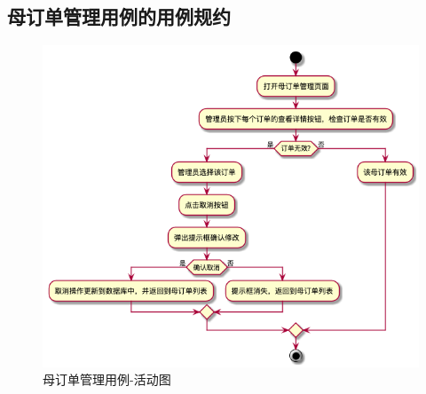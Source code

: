 \subsection{母订单管理用例的用例规约}

\begin{figure}[htp]
    \centering
    \includegraphics[width=16cm]{report/figure/usecase_v2/4_uc_admin_manage_mainOrder.png}
    \caption{母订单管理用例-活动图}
    \label{fig:4_uc_admin_manage_mainOrder}
\end{figure}


